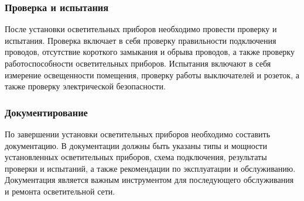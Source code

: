 \documentclass{article}
\begin{document}
\subsubsection{Проверка и испытания}
После установки осветительных приборов необходимо провести проверку и испытания. Проверка включает в себя проверку правильности подключения проводов, отсутствие короткого замыкания и обрыва проводов, а также проверку работоспособности осветительных приборов. Испытания включают в себя измерение освещенности помещения, проверку работы выключателей и розеток, а также проверку электрической безопасности.
\subsubsection{Документирование}
По завершении установки осветительных приборов необходимо составить документацию. В документации должны быть указаны типы и мощности установленных осветительных приборов, схема подключения, результаты проверки и испытаний, а также рекомендации по эксплуатации и обслуживанию. Документация является важным инструментом для последующего обслуживания и ремонта осветительной сети.
\end{document}
